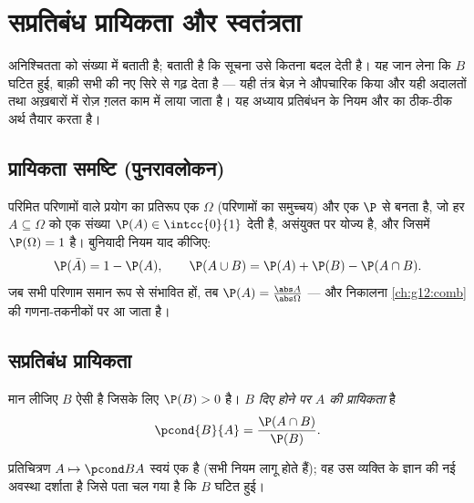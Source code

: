 \chapter{सप्रतिबंध प्रायिकता और स्वतंत्रता}\label{ch:g12:condprob}

 अनिश्चितता को संख्या में बताती है;  बताती है कि
सूचना उसे कितना बदल देती है। यह जान लेना कि  $B$ घटित हुई, बाक़ी सभी
 की  नए सिरे से गढ़ देता है --- यही तंत्र बेज़ ने औपचारिक
किया और यही अदालतों तथा अख़बारों में रोज़ ग़लत काम में लाया जाता है। यह अध्याय
प्रतिबंधन के नियम और  का ठीक-ठीक अर्थ तैयार करता है।

\section{प्रायिकता समष्टि (पुनरावलोकन)}

परिमित परिणामों वाले प्रयोग का प्रतिरूप एक \emph{} $\Omega$
(परिणामों का समुच्चय) और एक  $\P$ से बनता है, जो हर  $A \subseteq \Omega$ को एक
संख्या $\P(A) \in \intcc{0}{1}$ देती है, असंयुक्त  पर योज्य है, और जिसमें $\P(\Omega) = 1$ है। बुनियादी
नियम याद कीजिए:
\[
\P(\bar A) = 1 - \P(A),
\qquad
\P(A \cup B) = \P(A) + \P(B) - \P(A \cap B).
\]
जब सभी परिणाम समान रूप से संभावित हों, तब $\P(A) = \frac{\abs A}{\abs\Omega}$ --- और  निकालना \cref{ch:g12:comb}
की गणना-तकनीकों पर आ जाता है।

\section{सप्रतिबंध प्रायिकता}

\begin{definition}[सप्रतिबंध प्रायिकता]\label{def:g12:condprob:cond}
मान लीजिए $B$ ऐसी  है जिसके लिए $\P(B) > 0$ है। \emph{$B$ दिए होने पर $A$ की
प्रायिकता} है
\[
\pcond{B}{A} = \frac{\P(A \cap B)}{\P(B)} .
\]
\end{definition}

प्रतिचित्रण $A \mapsto \pcond BA$ स्वयं एक  है (सभी नियम लागू होते हैं); वह उस
व्यक्ति के ज्ञान की नई अवस्था दर्शाता है जिसे पता चल गया है कि $B$ घटित हुई।

